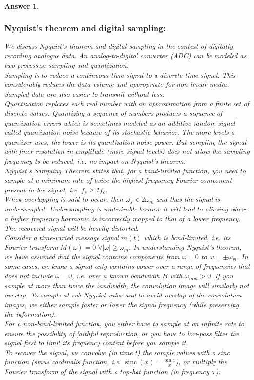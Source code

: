 \documentclass[a4paper]{article}
\DeclareMathOperator{\sinc}{sinc}
\newtheorem{ans}{Answer}[subsection]
\theoremstyle{new}
\begin{document}
\begin{ans}
\subsubsection*{Nyquist's theorem and digital sampling:}
We discuss Nyquist's theorem and digital sampling in the context of digitally recording analogue data. An analog-to-digital converter (ADC) can be modeled as two processes: sampling and quantization.\\[5pt]
Sampling is to reduce a continuous time signal to a discrete time signal. This considerably reduces the data volume and appropriate for non-linear media. Sampled data are also easier to transmit without loss.\\[5pt]
Quantization replaces each real number with an approximation from a finite set of discrete values. Quantizing a sequence of numbers produces a sequence of quantization errors which is sometimes modeled as an additive random signal called quantization noise because of its stochastic behavior. The more levels a quantizer uses, the lower is its quantization noise power. But sampling the signal with finer resolution in amplitude (more signal levels) does not allow the sampling frequency to be reduced, i.e. no impact on Nyquist's theorem.\\[5pt]
Nyquist's Sampling Theorem states that, for a band-limited function, you need to sample at a minimum rate of twice the highest frequency Fourier component present in the signal, i.e. $f_s\geq 2f_c$.\\[5pt]
When overlapping is said to occur, then $\omega_s<2\omega_m$ and thus the signal is undersampled. Undersampling is undesirable because it will lead to aliasing where a higher frequency harmonic is incorrectly mapped to that of a lower frequency. The recovered signal will be heavily distorted.\\[5pt]
Consider a time-varied message signal $m(t)$ which is band-limited, i.e. its Fourier transform $M(\omega)=0$ $\forall|\omega|\geq\omega_m$. In understanding Nyquist's theorem, we have assumed that the signal contains components from $\omega=0$ to $\omega=\pm\omega_m$. In some cases, we know a signal only contains power over a range of frequencies that does not include $\omega=0$, i.e. over a known bandwidth $B$ with $\omega_{min}>0$. If you sample at more than twice the bandwidth, the convolution image will similarly not overlap. To sample at sub-Nyquist rates and to avoid overlap of the convolution images, we either sample faster or lower the signal frequency (while preserving the information).\\[5pt]
For a non-band-limited function, you either have to sample at an infinite rate to ensure the possibility of faithful reproduction, or you have to low-pass filter the signal first to limit its frequency content before you sample it.\\[5pt]
To recover the signal, we convolve (in time $t$) the sample values with a sinc function (sinus cardinalis function, i.e. $\sinc(x)=\frac{\sin x}{x}$), or multiply the Fourier transform of the signal with a top-hat function (in frequency $\omega$).

\end{ans}
\end{document}
